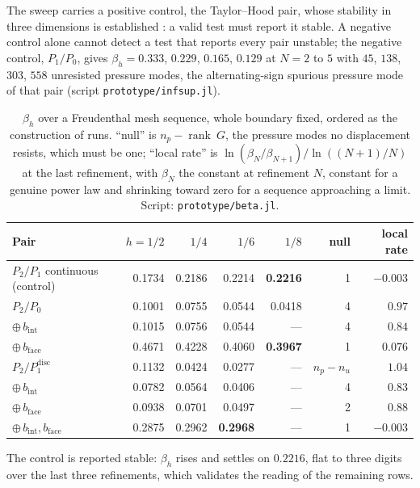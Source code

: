 \documentclass[11pt]{article}
\newcommand{\code}[1]{\texttt{#1}}
\theoremstyle{definition}
\theoremstyle{plain}
\begin{document}
The sweep carries a positive control, the Taylor--Hood pair, whose stability
in three dimensions is established \citep{BoffiBrezziFortin:2013}: a valid
test must report it stable. A negative control alone cannot detect a test that
reports every pair unstable; the negative control, $P_1/P_0$, gives
$\beta_h = 0.333$, $0.229$, $0.165$, $0.129$ at $N = 2$ to $5$ with $45$,
$138$, $303$, $558$ unresisted pressure modes, the alternating-sign spurious
pressure mode of that pair (script \code{prototype/infsup.jl}).

\begin{table}[h]
\centering
\begin{tabular}{@{}lrrrrrr@{}}
\toprule
Pair & $h = 1/2$ & $1/4$ & $1/6$ & $1/8$ & null & local rate \\
\midrule
$P_2/P_1$ continuous (control) & 0.1734 & 0.2186 & 0.2214 & \textbf{0.2216} & 1 & $-0.003$ \\
\midrule
$P_2/P_0$                      & 0.1001 & 0.0755 & 0.0544 & 0.0418 & 4 & $0.97$ \\
$\oplus\, b_{\mathrm{int}}$    & 0.1015 & 0.0756 & 0.0544 & --- & 4 & $0.84$ \\
$\oplus\, b_{\mathrm{face}}$   & 0.4671 & 0.4228 & 0.4060 & \textbf{0.3967} & 1 & $0.076$ \\
\midrule
$P_2/P_1^{\mathrm{disc}}$      & 0.1132 & 0.0424 & 0.0277 & --- & $n_p - n_u$ & $1.04$ \\
$\oplus\, b_{\mathrm{int}}$    & 0.0782 & 0.0564 & 0.0406 & --- & 4 & $0.83$ \\
$\oplus\, b_{\mathrm{face}}$   & 0.0938 & 0.0701 & 0.0497 & --- & 2 & $0.88$ \\
$\oplus\, b_{\mathrm{int}}, b_{\mathrm{face}}$
                               & 0.2875 & 0.2962 & \textbf{0.2968} & --- & 1 & $-0.003$ \\
\bottomrule
\end{tabular}
\caption{$\beta_h$ over a Freudenthal mesh sequence, whole boundary fixed, ordered as
the construction of \citet[Example~8.7.2]{BoffiBrezziFortin:2013} runs. ``null''
is $n_p - \operatorname{rank}~G$, the pressure modes no displacement resists,
which must be one; ``local rate'' is $\ln(\beta_N/\beta_{N+1})/\ln((N+1)/N)$
at the last refinement, with $\beta_N$ the constant at refinement $N$, constant for a genuine power law and shrinking toward
zero for a sequence approaching a limit. Script: \code{prototype/beta.jl}.}
\label{tab:beta}
\end{table}

The control is reported stable: $\beta_h$ rises and settles on $0.2216$, flat
to three digits over the last three refinements, which validates the reading
of the remaining rows.
\end{document}
